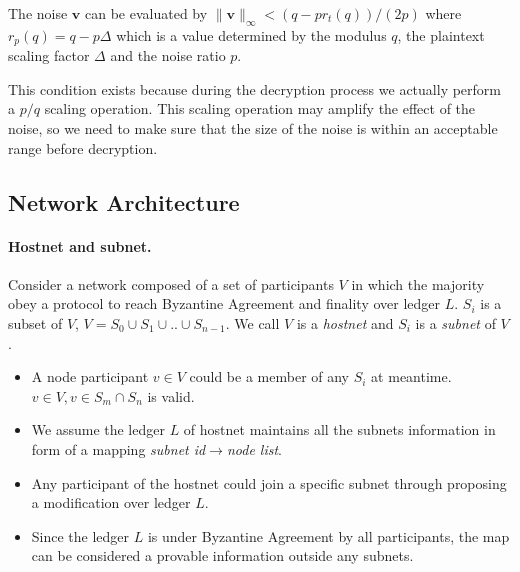 \documentclass[11pt]{article}
\begin{document}
The noise $\mathbf{v}$ can be evaluated by $\lVert\mathbf{v}\rVert_\infty < (q-p r_t(q))/(2p)$ where $r_p(q)=q-p\Delta$ which is a value determined by the modulus $q$, the plaintext scaling factor $\Delta$ and the noise ratio $p$.

This condition exists because during the decryption process we actually perform a $p/q$ scaling operation. This scaling operation may amplify the effect of the noise, so we need to make sure that the size of the noise is within an acceptable range before decryption.


\subsection{Network Architecture}
\paragraph{Hostnet and subnet.}
Consider a network composed of a set of participants $V$ in which the majority obey a protocol to reach Byzantine Agreement and finality\cite{grandpa} over ledger $L$. $S_{i}$ is a subset of $V$, \( V = S_{0} \cup S_{1} \cup .. \cup S_{n-1}  \). We call $V$ is a \textit{hostnet} and $S_{i}$ is a \textit{subnet} of $V$.
\begin{itemize}
\item A node participant \( v \in V \) could be a member of any $S_{i}$ at meantime.\( v \in V, v \in S_{m} \cap S_{n} \) is valid.
\item We assume the ledger $L$ of hostnet maintains all the subnets information in form of a mapping \textit{subnet id}\( \rightarrow \)\textit{node list}.
\item Any participant of the hostnet could join a specific subnet through proposing a modification over ledger $L$.
\item Since the ledger $L$ is under Byzantine Agreement by all participants, the map can be considered a provable information outside any subnets.
\end{itemize}
\end{document}
